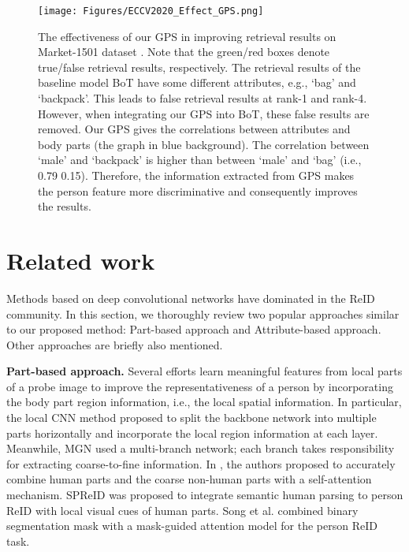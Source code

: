\documentclass[final]{cvpr}
\begin{document}
\begin{figure*}
    \centering
    \texttt{[image: Figures/ECCV2020\_Effect\_GPS.png]}
    \caption{The effectiveness of our GPS in improving retrieval results on Market-1501 dataset \cite{market1501}. Note that the green/red boxes denote true/false retrieval results, respectively. The retrieval results of the baseline model BoT \cite{BoT} have some different attributes, e.g., `bag' and `backpack'. This leads to false retrieval results at rank-1 and rank-4. However, when integrating our GPS into BoT, these false results are removed. Our GPS gives the correlations between attributes and body parts (the graph in blue background). The correlation between `male' and `backpack' is higher than between `male' and `bag' (i.e., 0.79  0.15). Therefore, the information extracted from GPS makes the person feature more discriminative and consequently improves the results.}
    \label{fig:vis_intro}
\end{figure*}









\section{Related work}
\label{sec:related_work}
Methods based on deep convolutional networks have dominated in the ReID community. In this section, we thoroughly review two popular approaches similar to our proposed method: Part-based approach and Attribute-based approach. Other approaches are briefly also mentioned.

\textbf{Part-based approach.}
Several efforts \cite{mgn,LocalCNN,dsa} learn meaningful features from local parts of a probe image to improve the representativeness of a person by incorporating the body part region information, i.e., the local spatial information. In particular, the local CNN method \cite{LocalCNN} proposed to split the backbone network into multiple parts horizontally and incorporate the local region information at each layer. Meanwhile, MGN \cite{mgn} used a multi-branch network; each branch takes responsibility for extracting coarse-to-fine information. In \cite{p2net}, the authors proposed to accurately combine human parts and the coarse non-human parts with a self-attention mechanism. SPReID \cite{SPReID} was proposed to integrate semantic human parsing to person ReID with local visual cues of human parts. Song et al. \cite{MGCAM} combined binary segmentation mask with a mask-guided attention model for the person ReID task.
\end{document}
